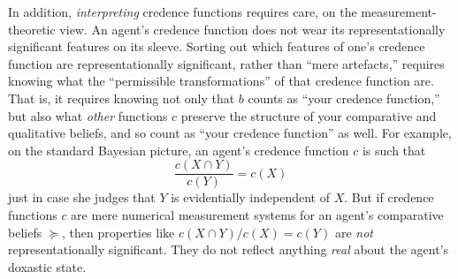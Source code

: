 In addition, \textit{interpreting} credence functions requires care, on the measurement-theoretic view. An agent's credence function does not wear its representationally significant features on its sleeve. Sorting out which features of one's credence function are representationally significant, rather than ``mere artefacts,'' requires knowing what the ``permissible transformations'' of that credence function are. That is, it requires knowing not only that $b$ counts as ``your credence function,'' but also what \textit{other} functions $c$ preserve the structure of your comparative and qualitative beliefs, and so count as ``your credence function'' as well. For example, on the standard Bayesian picture, an agent's credence function $c$ is such that
\[
\frac{c(X\cap Y)}{c(Y)} = c(X)
\]
just in case she judges that $Y$ is evidentially independent of $X$. But if credence functions $c$ are mere numerical measurement systems for an agent's comparative beliefs $\succeq$, then properties like $c(X\cap Y)/c(X)=c(Y)$ are \textit{not} representationally significant. They do not reflect anything \textit{real} about the agent's doxastic state.

